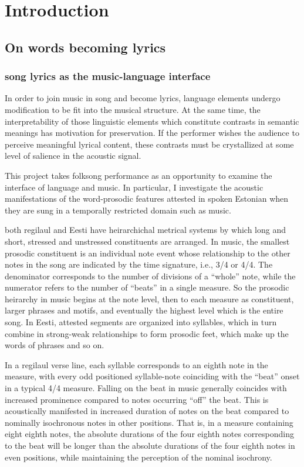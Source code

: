 \chapter{Introduction}

\section{On words becoming lyrics}
\subsection{song lyrics as the music-language interface}

In order to join music in song and become lyrics, language elements undergo modification to be fit into the musical structure. At the same time, the interpretability of those linguistic elements which constitute contrasts in semantic meanings has motivation for preservation. If the performer wishes the audience to perceive meaningful lyrical content, these contrasts must be crystallized at some level of salience in the acoustic signal. 

This project takes folksong performance as an opportunity to examine the interface of language and music. In particular, I investigate the acoustic manifestations of the word-prosodic features attested in spoken Estonian when they are sung in a temporally restricted domain such as music. 


both regilaul and Eesti have heirarchichal metrical systems by which long and short, stressed and unstressed constituents are arranged. In music, the smallest prosodic constituent is an individual note event whose relationship to the other notes in the song are indicated by the time signature, i.e., 3/4 or 4/4. The denominator corresponds to the number of divisions of a ``whole'' note, while the numerator refers to the number of ``beats'' in a single measure. So the prosodic heirarchy in music begins at the note level, then to each measure as constituent, larger phrases and motifs, and eventually the highest level which is the entire song. In Eesti, attested segments are organized into syllables, which in turn combine in strong-weak relationships to form prosodic feet, which make up the words of phrases and so on. 



 In a regilaul verse line, each syllable corresponds to an eighth note in the measure, with every odd positioned syllable-note coinciding with the ``beat'' onset in a typical 4/4 measure. Falling on the beat in music generally coincides with increased prominence compared to notes occurring ``off'' the beat. This is acoustically manifested in increased duration of notes on the beat compared to nominally isochronous notes in other positions. That is, in a measure containing eight eighth notes, the absolute durations of the four eighth notes corresponding to the beat will be longer than the absolute durations of the four eighth notes in even positions, while maintaining the perception of the nominal isochrony. 



